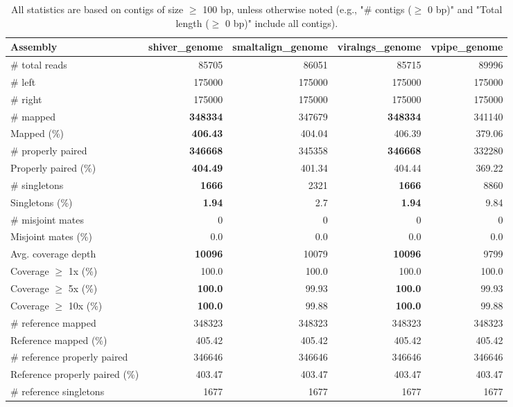 \documentclass[12pt,a4paper]{article}
\begin{document}
\begin{table}[ht]
\begin{center}
\caption{All statistics are based on contigs of size $\geq$ 100 bp, unless otherwise noted (e.g., "\# contigs ($\geq$ 0 bp)" and "Total length ($\geq$ 0 bp)" include all contigs).}
\begin{tabular}{|l*{4}{|r}|}
\hline
Assembly & shiver\_genome & smaltalign\_genome & viralngs\_genome & vpipe\_genome \\ \hline
\# total reads & 85705 & 86051 & 85715 & 89996 \\ \hline
\# left & 175000 & 175000 & 175000 & 175000 \\ \hline
\# right & 175000 & 175000 & 175000 & 175000 \\ \hline
\# mapped & {\bf 348334} & 347679 & {\bf 348334} & 341140 \\ \hline
Mapped (\%) & {\bf 406.43} & 404.04 & 406.39 & 379.06 \\ \hline
\# properly paired & {\bf 346668} & 345358 & {\bf 346668} & 332280 \\ \hline
Properly paired (\%) & {\bf 404.49} & 401.34 & 404.44 & 369.22 \\ \hline
\# singletons & {\bf 1666} & 2321 & {\bf 1666} & 8860 \\ \hline
Singletons (\%) & {\bf 1.94} & 2.7 & {\bf 1.94} & 9.84 \\ \hline
\# misjoint mates & 0 & 0 & 0 & 0 \\ \hline
Misjoint mates (\%) & 0.0 & 0.0 & 0.0 & 0.0 \\ \hline
Avg. coverage depth & {\bf 10096} & 10079 & {\bf 10096} & 9799 \\ \hline
Coverage $\geq$ 1x (\%) & 100.0 & 100.0 & 100.0 & 100.0 \\ \hline
Coverage $\geq$ 5x (\%) & {\bf 100.0} & 99.93 & {\bf 100.0} & 99.93 \\ \hline
Coverage $\geq$ 10x (\%) & {\bf 100.0} & 99.88 & {\bf 100.0} & 99.88 \\ \hline
\# reference mapped & 348323 & 348323 & 348323 & 348323 \\ \hline
Reference mapped (\%) & 405.42 & 405.42 & 405.42 & 405.42 \\ \hline
\# reference properly paired & 346646 & 346646 & 346646 & 346646 \\ \hline
Reference properly paired (\%) & 403.47 & 403.47 & 403.47 & 403.47 \\ \hline
\# reference singletons & 1677 & 1677 & 1677 & 1677 \\ \hline

\end{tabular}
\end{center}
\end{table}
\end{document}
